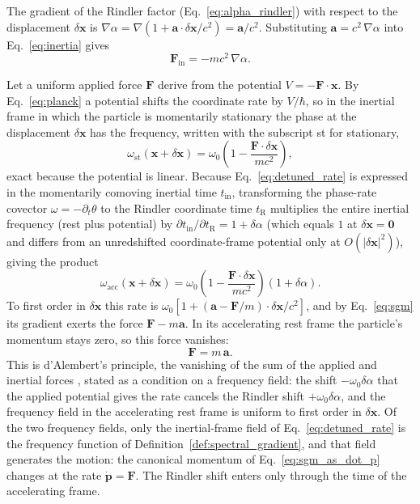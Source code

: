 \documentclass[aps,prd,onecolumn,tightenlines,nofootinbib,notitlepage,11pt,floatfix]{revtex4-2}
\theoremstyle{indentedtheorem}
\begin{document}
The gradient of the Rindler factor (Eq.~\eqref{eq:alpha_rindler}) with respect to the displacement $\delta\mathbf{x}$ is $\nabla\alpha=\nabla(1+\mathbf{a}\cdot\delta\mathbf{x}/c^2)=\mathbf{a}/c^2$. Substituting $\mathbf{a}=c^2\,\nabla\alpha$ into Eq.~\eqref{eq:inertia} gives
\begin{equation}
    \mathbf{F}_\text{in} = -mc^2\,\nabla\alpha .
    \label{eq:inertia_geometric}
\end{equation}

Let a uniform applied force $\mathbf{F}$ derive from the potential $V=-\mathbf{F}\cdot\mathbf{x}$. By Eq.~\eqref{eq:planck} a potential shifts the coordinate rate by $V/\hbar$, so in the inertial frame in which the particle is momentarily stationary the phase at the displacement $\delta\mathbf{x}$ has the frequency, written with the subscript st for stationary,
\begin{equation}
    \omega_\text{st}(\mathbf{x}+\delta\mathbf{x}) = \omega_0 \left(1-\frac{\mathbf{F}\cdot\delta\mathbf{x}}{mc^2}\right) ,
    \label{eq:detuned_rate}
\end{equation}
exact because the potential is linear. Because Eq.~\eqref{eq:detuned_rate} is expressed in the momentarily comoving inertial time $t_\text{in}$, transforming the phase-rate covector $\omega=-\partial_t\theta$ to the Rindler coordinate time $t_\text{R}$ multiplies the entire inertial frequency (rest plus potential) by $\partial t_\text{in}/\partial t_\text{R}=1+\delta\alpha$ (which equals $1$ at $\delta\mathbf{x}=\mathbf{0}$ and differs from an unredshifted coordinate-frame potential only at $O(|\delta\mathbf{x}|^2)$), giving the product
\begin{equation}
    \omega_\text{acc}(\mathbf{x}+\delta\mathbf{x}) = \omega_0 \left(1-\frac{\mathbf{F}\cdot\delta\mathbf{x}}{mc^2}\right) (1+\delta\alpha) .
    \label{eq:flat_total}
\end{equation}
To first order in $\delta\mathbf{x}$ this rate is $\omega_0[1+(\mathbf{a}-\mathbf{F}/m)\cdot\delta\mathbf{x}/c^2]$, and by Eq.~\eqref{eq:sgm} its gradient exerts the force $\mathbf{F}-m\mathbf{a}$. In its accelerating rest frame the particle's momentum stays zero, so this force vanishes:
\begin{equation}
    \mathbf{F} = m\,\mathbf{a} .
    \label{eq:second_law}
\end{equation}
This is d'Alembert's principle, the vanishing of the sum of the applied and inertial forces \citep{DAlembert1743Traite,Goldstein2002Classical}, stated as a condition on a frequency field: the shift $-\omega_0\delta\alpha$ that the applied potential gives the rate cancels the Rindler shift $+\omega_0\delta\alpha$, and the frequency field in the accelerating rest frame is uniform to first order in $\delta\mathbf{x}$. Of the two frequency fields, only the inertial-frame field of Eq.~\eqref{eq:detuned_rate} is the frequency function of Definition~\ref{def:spectral_gradient}, and that field generates the motion: the canonical momentum of Eq.~\eqref{eq:sgm_as_dot_p} changes at the rate $\dot{\mathbf{p}}=\mathbf{F}$. The Rindler shift enters only through the time of the accelerating frame.
\end{document}
